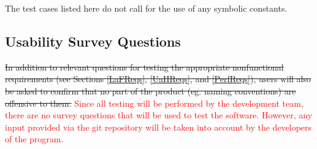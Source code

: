 \documentclass[12pt, titlepage]{article}
\begin{document}
The test cases listed here do not call for the use of any symbolic constants.

\subsection{Usability Survey Questions}

\sout{In addition to relevant questions for testing the appropriate nonfunctional requirements (see Sections \ref{LaFReqs}, \ref{UaHReqs}, and \ref{PerfReqs}), users will also be asked to confirm that no part of the product (eg. naming conventions) are offensive to them.} \textcolor{red}{Since all testing will be performed by the development team, there are no survey questions that will be used to test the software. However, any input provided via the git repository will be taken into account by the developers of the program.}
\end{document}
